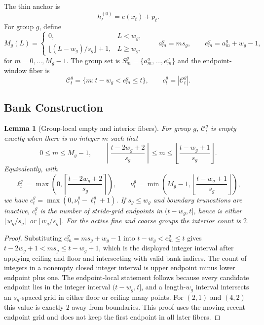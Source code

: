 \documentclass{article}
\theoremstyle{plain}
\newtheorem{lemma}[theorem]{Lemma}
\theoremstyle{definition}
\theoremstyle{remark}
\begin{document}
The thin anchor is
\begin{equation}
h_t^{(0)}=e(x_t)+p_t.
\end{equation}
For group $g$, define
\begin{equation}
M_g(L)=\begin{cases}
0,&L<w_g,\\
\lfloor(L-w_g)/s_g\rfloor+1,&L\ge w_g,
\end{cases}
\qquad
a_m^g=ms_g,
\qquad
e_m^g=a_m^g+w_g-1,
\end{equation}
for $m=0,\ldots,M_g-1$.  The group set is $S_m^g=\{a_m^g,\ldots,e_m^g\}$ and the endpoint-window fiber is
\begin{equation}
\mathcal C_t^g=\{m:t-w_g<e_m^g\le t\},\qquad c_t^g=|\mathcal C_t^g|.
\end{equation}

\subsection{Bank Construction}
\label{sec:mrp6-bank}

\begin{lemma}[Group-local empty and interior fibers]
\label{prop:empty-strict-past-fibers}
For group $g$, $\mathcal C_t^g$ is empty exactly when there is no integer $m$ such that
\begin{equation}
0\le m\le M_g-1,
\qquad
\left\lceil\frac{t-2w_g+2}{s_g}\right\rceil\le m\le \left\lfloor\frac{t-w_g+1}{s_g}\right\rfloor.
\end{equation}
Equivalently, with
\begin{equation}
\ell_t^g=\max\!\left(0,\left\lceil\frac{t-2w_g+2}{s_g}\right\rceil\right),\qquad
\nu_t^g=\min\!\left(M_g-1,\left\lfloor\frac{t-w_g+1}{s_g}\right\rfloor\right),
\end{equation}
we have $c_t^g=\max(0,\nu_t^g-\ell_t^g+1)$.  If $s_g\le w_g$ and boundary truncations are inactive, $c_t^g$ is the number of stride-grid endpoints in $(t-w_g,t]$, hence is either $\lfloor w_g/s_g\rfloor$ or $\lceil w_g/s_g\rceil$.  For the active fine and coarse groups the interior count is $2$.
\end{lemma}

\begin{proof}
Substituting $e_m^g=ms_g+w_g-1$ into $t-w_g<e_m^g\le t$ gives
$t-2w_g+1<ms_g\le t-w_g+1$, which is the displayed integer interval after applying ceiling and floor and intersecting with valid bank indices.  The count of integers in a nonempty closed integer interval is upper endpoint minus lower endpoint plus one.  The endpoint-local statement follows because every candidate endpoint lies in the integer interval $(t-w_g,t]$, and a length-$w_g$ interval intersects an $s_g$-spaced grid in either floor or ceiling many points.  For $(2,1)$ and $(4,2)$ this value is exactly $2$ away from boundaries.  This proof uses the moving recent endpoint grid and does not keep the first endpoint in all later fibers.
\end{proof}
\end{document}
